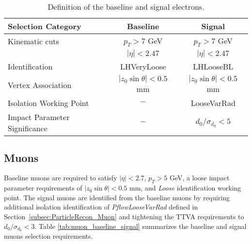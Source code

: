 \begin{table}[ht]
    \centering
        \caption{Definition of the baseline and signal electrons.\label{tab:Electron_RecoSel}}
        \begin{tabular}{|| l || c | c ||}
        \hline
        Selection Category & \textbf{Baseline} & \textbf{Signal} \\
        \hline\hline
        Kinematic cuts & $p_{T} > 7$ GeV & $ p_{T} > 7$ GeV \\
                    & $|\eta| < 2.47$  &  $|\eta| < 2.47$\\
        \hline  
        Identification & LHVeryLoose & LHLooseBL \\
        \hline 
        Vertex Association & $|z_{0}\sin\theta| < 0.5$ mm & $|z_{0}\sin\theta|< 0.5$ mm\\
        \hline
        Isolation Working Point & $-$ & LooseVarRad\\
        \hline 
        Impact Parameter Significance & $-$ & $d_{0}/ \sigma_{d_{0}} < 5$ \\
        \hline
    \end{tabular}
\end{table}

\subsection{Muons}
\label{subsec:MuonRecon}
Baseline muons are required to satisfy $ |\eta| < 2.7 $, $p_{T} > 5$ GeV, a loose impact parameter requirements of $|z_{0}\sin\theta| < 0.5 $ mm, and \textit{Loose} identification working point. The signal muons are identified from the baseline muons by requiring additional isolation identification of \textit{PflowLooseVarRad} defined in Section~\ref{subsec:ParticleRecon_Muon} and tightening the TTVA requirements to $d_{0}/\sigma_{d_{0}} < 3$. Table \ref{tab:muon_baseline_signal} summarizes the baseline and signal muons selection requirements.

